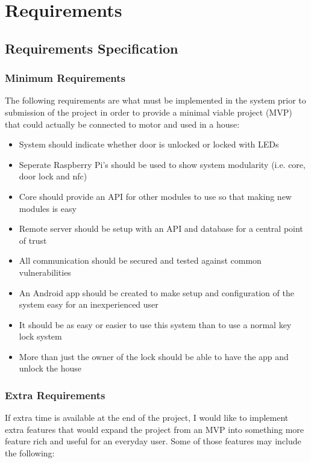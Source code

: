\chapter{Requirements}
\label{chap:requirements}

\section{Requirements Specification}

\subsection{Minimum Requirements}
The following requirements are what must be implemented in the system prior to submission of the project in order to provide a minimal viable project (MVP) that could actually be connected to motor and used in a house:

\begin{itemize}
	\item System should indicate whether door is unlocked or locked with LEDs
	\item Seperate Raspberry Pi's should be used to show system modularity (i.e. core, door lock and nfc)
	\item Core should provide an API for other modules to use so that making new modules is easy
	\item Remote server should be setup with an API and database for a central point of trust
	\item All communication should be secured and tested against common vulnerabilities
	\item An Android app should be created to make setup and configuration of the system easy for an inexperienced user
	\item It should be as easy or easier to use this system than to use a normal key lock system
	\item More than just the owner of the lock should be able to have the app and unlock the house
\end{itemize}

\subsection{Extra Requirements}

If extra time is available at the end of the project, I would like to implement extra features that would expand the project from an MVP into something more feature rich and useful for an everyday user. Some of those features may include the following:

